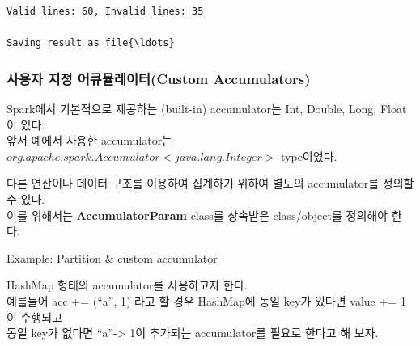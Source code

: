 \documentclass[11pt]{article}
\begin{document}
    \begin{Verbatim}[commandchars=\\\{\}]
Valid lines: 60, Invalid lines: 35

Saving result as file{\ldots}

    \end{Verbatim}

    \subsubsection{사용자 지정 어큐뮬레이터(Custom
Accumulators)}\label{uxc0acuxc6a9uxc790-uxc9c0uxc815-uxc5b4uxd050uxbbacuxb808uxc774uxd130custom-accumulators}

    Spark에서 기본적으로 제공하는 (built-in) accumulator는 Int, Double,
Long, Float 이 있다.\\앞서 예에서 사용한 accumulator는
$org.apache.spark.Accumulator<java.lang.Integer>$ type이었다.

다른 연산이나 데이터 구조를 이용하여 집계하기 위하여 별도의
accumulator를 정의할 수 있다.\\이를 위해서는 \textbf{AccumulatorParam}
class를 상속받은 class/object를 정의해야 한다.

    Example: Partition \& custom accumulator

    HashMap 형태의 accumulator를 사용하고자 한다.\\예를들어 acc += (``a'',
1) 라고 할 경우 HashMap에 동일 key가 있다면 value += 1이 수행되고\\동일
key가 없다면 ``a''-\textgreater{} 1이 추가되는 accumulator를 필요로
한다고 해 보자.
\end{document}
